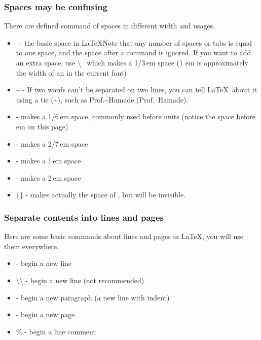 \begin{frame}
    \frametitle{Spaces may be confusing}
    There are defined command of spaces in different width and usages.
    \begin{itemize}
        \item \textvisiblespace\ - the basic space in \LaTeX\. Note that any number of spaces or tabs is equal to one space, and the space after a command is ignored. If you want to add an extra space, use \alert{\textbackslash\textvisiblespace\ } which makes a 1/3\,em space (1 em is approximately the width of an  in the current font)
        \item \~{} - If two words can't be separated on two lines, you can tell \LaTeX\ about it using a tie (\~{}), such as Prof.\~{}Hamade (Prof.~Hamade).
        \item  \samplecommand{,} - makes a 1/6\,em space, commonly used before units (notice the space before em on this page)
        \item  \samplecommand{;} - makes a 2/7\,em space
        \item  {} - makes a 1\,em space
        \item  {} - makes a 2\,em space
        \item  {}\{\} - makes actually the space of , but  will be invisible.
    \end{itemize}
\end{frame}

\begin{frame}
    \frametitle{Separate contents into lines and pages}
    Here are some basic commands about lines and pages in \LaTeX,  you will use them everywhere.
    \pause
    \begin{itemize}
        \item {} - begin a new line
        \item \alert{\textbackslash\textbackslash} - begin a new line (not recommended\footnotemark[1])
        \item {} - begin a new paragraph (a new line with indent)
        \item {} - begin a new page
        \item \alert{\%} - begin a line comment
    \end{itemize}
\end{frame}

